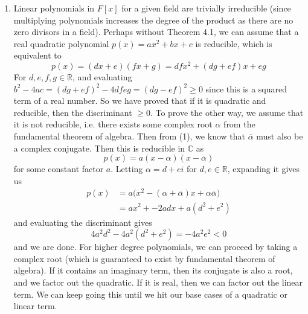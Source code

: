 \begin{solution}
\begin{enumerate}
      \item Linear polynomials in $F[x]$ for a given field are trivially irreducible (since multiplying polynomials increases the degree of the product as there are no zero divisors in a field). Perhaps without Theorem 4.1, we can assume that a real quadratic polynomial $p(x) = ax^2 + bx + c$ is reducible, which is equivalent to 
      \begin{equation}
        p(x) = (dx + e)(fx + g) = dfx^2 + (dg + ef) x + eg 
      \end{equation}
      For $d, e, f, g \in \mathbb{R}$, and evaluating $b^2 - 4ac = (dg + ef)^2 - 4dfeg = (dg - ef)^2 \geq 0$ since this is a squared term of a real number. So we have proved that if it is quadratic and reducible, then the discriminant $\geq 0$. To prove the other way, we assume that it is not reducible, i.e. there exists some complex root $\alpha$ from the fundamental theorem of algebra. Then from (1), we know that $\overline{\alpha}$ must also be a complex conjugate. Then this is reducible in $\mathbb{C}$ as 
      \begin{equation}
        p(x) = a (x - \alpha) (x - \overline{\alpha}) 
      \end{equation}
      for some constant factor $a$. Letting $\alpha = d + ei$ for $d, e \in \mathbb{R}$, expanding it gives us 
      \begin{align}
        p(x) & = a \big( x^2 - (\alpha + \overline{\alpha}) x + \alpha \overline{\alpha} \big) \\
             & = a x^2 + - 2 a d x + a(d^2 + e^2)
      \end{align}
      and evaluating the discriminant gives  
      \begin{equation}
        4a^2 d^2 - 4 a^2 (d^2 + e^2) = -4 a^2 e^2 < 0
      \end{equation}
      and we are done. For higher degree polynomials, we can proceed by taking a complex root (which is guaranteed to exist by fundamental theorem of algebra). If it contains an imaginary term, then its conjugate is also a root, and we factor out the quadratic. If it is real, then we can factor out the linear term. We can keep going this until we hit our base cases of a quadratic or linear term. 
    \end{enumerate}
  \end{solution}

